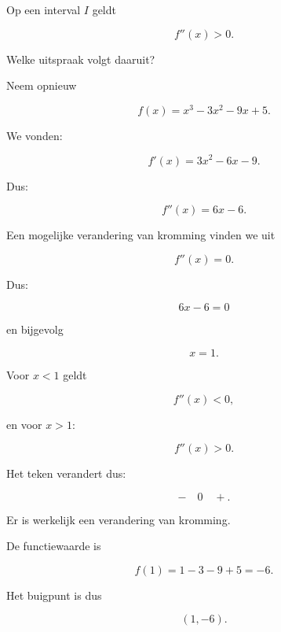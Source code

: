 \documentclass{ximera}
\begin{document}
\begin{oefening}{\oefB\ESS}

Op een interval $I$ geldt

\[
f''(x)>0.
\]

Welke uitspraak volgt daaruit?

\begin{multipleChoice}
\end{multipleChoice}

\end{oefening}



\begin{voorbeeld}

Neem opnieuw

\[
f(x)=x^3-3x^2-9x+5.
\]

We vonden:

\[
f'(x)=3x^2-6x-9.
\]

Dus:

\[
f''(x)=6x-6.
\]

Een mogelijke verandering van kromming vinden we uit

\[
f''(x)=0.
\]

Dus:

\[
6x-6=0
\]

en bijgevolg

\[
x=1.
\]

Voor $x<1$ geldt

\[
f''(x)<0,
\]

en voor $x>1$:

\[
f''(x)>0.
\]

Het teken verandert dus:

\[
-\quad 0\quad +.
\]

Er is werkelijk een verandering van kromming.

De functiewaarde is

\[
f(1)=1-3-9+5=-6.
\]

Het buigpunt is dus

\[
\boxed{(1,-6)}.
\]

\end{voorbeeld}
\end{document}
